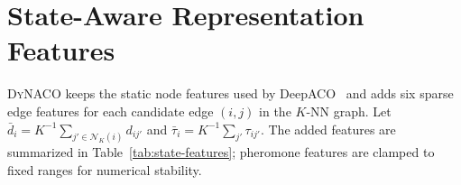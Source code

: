 \documentclass[sigconf]{acmart}
\newcommand{\DyNACO}{\textsc{DyNACO}}
\begin{document}


\balance


\newpage
\appendix

\setcounter{table}{0}
\renewcommand{\thetable}{A\arabic{table}}
\setcounter{figure}{0}
\renewcommand{\thefigure}{A\arabic{figure}}
\setcounter{algorithm}{0}
\renewcommand{\thealgorithm}{A\arabic{algorithm}}

\section{State-Aware Representation Features}
\label{app:state-features}

\DyNACO{} keeps the static node features used by DeepACO~\cite{deepaco} and adds six sparse edge features for each candidate edge $(i,j)$ in the $K$-NN graph. Let
$\bar d_i=K^{-1}\sum_{j'\in\mathcal{N}_K(i)}d_{ij'}$ and
$\bar\tau_i=K^{-1}\sum_{j'}\tau_{ij'}$. The added features are summarized in Table~\ref{tab:state-features}; pheromone features are clamped to fixed ranges for numerical stability.
\end{document}
